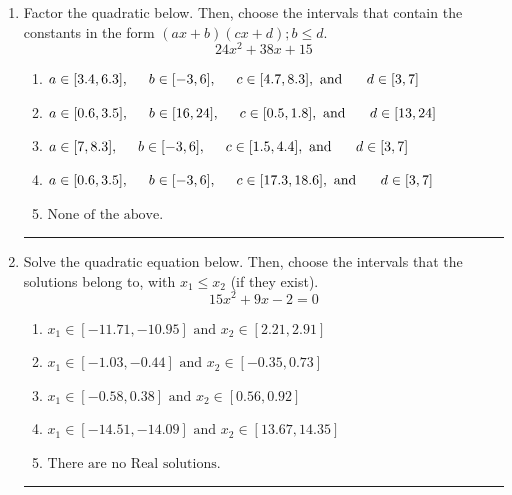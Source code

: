 \documentclass[14pt]{extbook}
\newcommand{\litem}[1]{\item#1\hspace*{-1cm}\rule{\textwidth}{0.4pt}}
\begin{document}
\begin{enumerate}
{\begin{enumerate}[label=\Alph*.]
\end{enumerate} }
\litem{
Factor the quadratic below. Then, choose the intervals that contain the constants in the form $(ax+b)(cx+d); b \leq d.$\[ 24x^{2} +38 x + 15 \]\begin{enumerate}[label=\Alph*.]
\item \( a \in [3.4, 6.3], \hspace*{5mm} b \in [-3, 6], \hspace*{5mm} c \in [4.7, 8.3], \text{ and } \hspace*{5mm} d \in [3, 7] \)
\item \( a \in [0.6, 3.5], \hspace*{5mm} b \in [16, 24], \hspace*{5mm} c \in [0.5, 1.8], \text{ and } \hspace*{5mm} d \in [13, 24] \)
\item \( a \in [7, 8.3], \hspace*{5mm} b \in [-3, 6], \hspace*{5mm} c \in [1.5, 4.4], \text{ and } \hspace*{5mm} d \in [3, 7] \)
\item \( a \in [0.6, 3.5], \hspace*{5mm} b \in [-3, 6], \hspace*{5mm} c \in [17.3, 18.6], \text{ and } \hspace*{5mm} d \in [3, 7] \)
\item \( \text{None of the above.} \)

\end{enumerate} }
\litem{
Solve the quadratic equation below. Then, choose the intervals that the solutions belong to, with $x_1 \leq x_2$ (if they exist).\[ 15x^{2} +9 x -2 = 0 \]\begin{enumerate}[label=\Alph*.]
\item \( x_1 \in [-11.71, -10.95] \text{ and } x_2 \in [2.21, 2.91] \)
\item \( x_1 \in [-1.03, -0.44] \text{ and } x_2 \in [-0.35, 0.73] \)
\item \( x_1 \in [-0.58, 0.38] \text{ and } x_2 \in [0.56, 0.92] \)
\item \( x_1 \in [-14.51, -14.09] \text{ and } x_2 \in [13.67, 14.35] \)
\item \( \text{There are no Real solutions.} \)


\end{enumerate}}
\end{enumerate}
\end{document}
